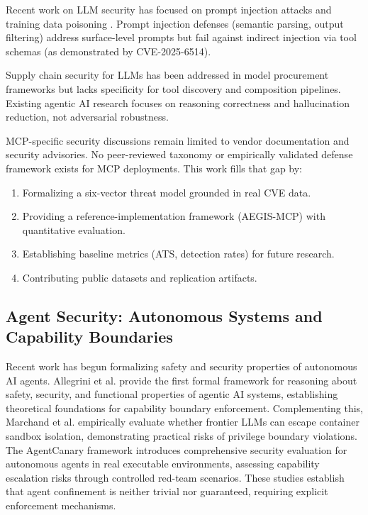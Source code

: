 \documentclass[12pt,twocolumn,journal]{IEEEtran}
\begin{document}
Recent work on LLM security has focused on prompt injection attacks \cite{Wei2023,Liu2023} and training data poisoning \cite{Wallace2021,Carlini2023}. Prompt injection defenses (semantic parsing, output filtering) address surface-level prompts but fail against indirect injection via tool schemas (as demonstrated by CVE-2025-6514).

Supply chain security for LLMs has been addressed in model procurement frameworks \cite{Tramèr2023} but lacks specificity for tool discovery and composition pipelines. Existing agentic AI research \cite{Mayr2023} focuses on reasoning correctness and hallucination reduction, not adversarial robustness.

MCP-specific security discussions remain limited to vendor documentation and security advisories. No peer-reviewed taxonomy or empirically validated defense framework exists for MCP deployments. This work fills that gap by:

\begin{enumerate}
\item Formalizing a six-vector threat model grounded in real CVE data.
\item Providing a reference-implementation framework (AEGIS-MCP) with quantitative evaluation.
\item Establishing baseline metrics (ATS, detection rates) for future research.
\item Contributing public datasets and replication artifacts.
\end{enumerate}

\subsection{Agent Security: Autonomous Systems and Capability Boundaries}

Recent work has begun formalizing safety and security properties of autonomous AI agents. Allegrini et al. \cite{Allegrini2025} provide the first formal framework for reasoning about safety, security, and functional properties of agentic AI systems, establishing theoretical foundations for capability boundary enforcement. Complementing this, Marchand et al. \cite{Marchand2026} empirically evaluate whether frontier LLMs can escape container sandbox isolation, demonstrating practical risks of privilege boundary violations. The AgentCanary framework \cite{Li2026} introduces comprehensive security evaluation for autonomous agents in real executable environments, assessing capability escalation risks through controlled red-team scenarios. These studies establish that agent confinement is neither trivial nor guaranteed, requiring explicit enforcement mechanisms.
\end{document}
